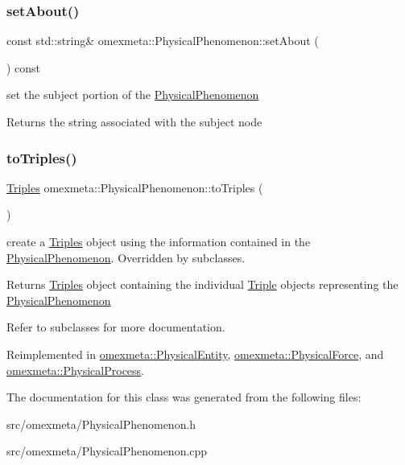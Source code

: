 \subsubsection{\texorpdfstring{set\+About()}{setAbout()}}
{\footnotesize\ttfamily const std\+::string\& omexmeta\+::\+Physical\+Phenomenon\+::set\+About (\begin{DoxyParamCaption}{ }\end{DoxyParamCaption}) const}



set the subject portion of the \hyperlink{classomexmeta_1_1PhysicalPhenomenon}{Physical\+Phenomenon} 

\begin{DoxyReturn}{Returns}
the string associated with the subject node 
\end{DoxyReturn}
\mbox{\label{classomexmeta_1_1PhysicalPhenomenon_a30617e685bd8b155a76d38ab5a9db273}} 
\subsubsection{\texorpdfstring{to\+Triples()}{toTriples()}}
{\footnotesize\ttfamily \hyperlink{classomexmeta_1_1Triples}{Triples} omexmeta\+::\+Physical\+Phenomenon\+::to\+Triples (\begin{DoxyParamCaption}{ }\end{DoxyParamCaption})\hspace{0.3cm}{\ttfamily [virtual]}}



create a \hyperlink{classomexmeta_1_1Triples}{Triples} object using the information contained in the \hyperlink{classomexmeta_1_1PhysicalPhenomenon}{Physical\+Phenomenon}. Overridden by subclasses. 

\begin{DoxyReturn}{Returns}
\hyperlink{classomexmeta_1_1Triples}{Triples} object containing the individual \hyperlink{classomexmeta_1_1Triple}{Triple} objects representing the \hyperlink{classomexmeta_1_1PhysicalPhenomenon}{Physical\+Phenomenon}
\end{DoxyReturn}
Refer to subclasses for more documentation. 

Reimplemented in \hyperlink{classomexmeta_1_1PhysicalEntity_a51f5df8b2e8a1d65e5aa0d10e53b77ba}{omexmeta\+::\+Physical\+Entity}, \hyperlink{classomexmeta_1_1PhysicalForce_a39dd511aee85130d07cb6ffb3f8e87f0}{omexmeta\+::\+Physical\+Force}, and \hyperlink{classomexmeta_1_1PhysicalProcess_ab6f6af00fac2401f9a88e186fd1d897a}{omexmeta\+::\+Physical\+Process}.



The documentation for this class was generated from the following files\+:\begin{DoxyCompactItemize}
\item 
src/omexmeta/Physical\+Phenomenon.\+h\item 
src/omexmeta/Physical\+Phenomenon.\+cpp\end{DoxyCompactItemize}
